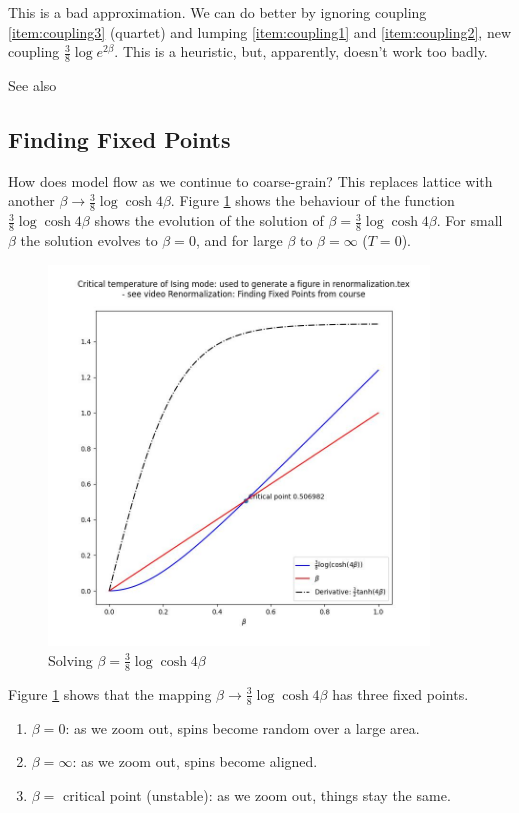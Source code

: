 \documentclass[]{article}
\begin{document}
This is a bad approximation. We can do better by ignoring coupling \ref{item:coupling3} (quartet) and lumping \ref{item:coupling1} and \ref{item:coupling2}, new coupling $\frac{3}{8} \log{e^{2\beta} }$. This is a heuristic, but, apparently, doesn't work too badly.


See also \cite[Chapter 14]{kadanoff2000statistical}


\subsection{Finding Fixed Points}

How does model flow as we continue to coarse-grain? This replaces lattice with another  $\beta\rightarrow\frac{3}{8} \log{\cosh{4\beta} }$. Figure \ref{fig:beta} shows the behaviour of the function $\frac{3}{8} \log{\cosh{4\beta} }$ shows the evolution of the solution of  $\beta=\frac{3}{8} \log{\cosh{4\beta} }$. For small $\beta$ the solution evolves to $\beta=0$, and for large $\beta$ to $\beta=\infty$ ($T=0$).


\begin{figure}[H]
	\caption{Solving $\beta=\frac{3}{8} \log{\cosh{4\beta} }$}\label{fig:beta}
	\includegraphics[width=0.9\textwidth]{beta}
\end{figure}

Figure \ref{fig:beta} shows that the mapping $\beta\rightarrow\frac{3}{8} \log{\cosh{4\beta} }$ has three fixed points.
\begin{enumerate}
	\item $\beta=0$: as we zoom out, spins become random over a large area.
	\item  $\beta=\infty$: as we zoom out, spins become aligned.
	\item  $\beta=$ critical point (unstable): as we zoom out, things stay the same.
\end{enumerate}
\end{document}

